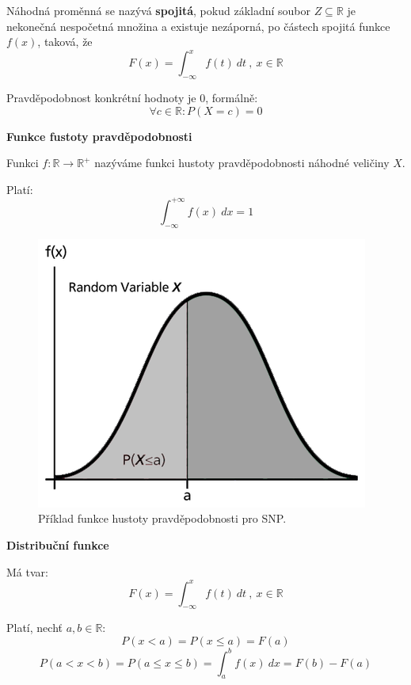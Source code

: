 \begin{compactitem}
    \item Náhodná proměnná se nazývá \textbf{spojitá}, pokud základní soubor $Z \subseteq \mathbb{R}$ je nekonečná nespočetná množina a existuje nezáporná, po částech spojitá funkce $f(x)$, taková, že
    $$ F(x) = \int_{- \infty}^{x} f(t) ~ dt ~,~ x \in \mathbb{R} $$

    \item Pravděpodobnost konkrétní hodnoty je $0$, formálně:
    $$ \forall c \in \mathbb{R} : P(X=c) = 0$$

    \item \textbf{Funkce fustoty pravděpodobnosti} \begin{compactitem}
        \item Funkci $f : \mathbb{R} \rightarrow \mathbb{R}^{+}$ nazýváme funkci hustoty pravděpodobnosti náhodné veličiny $X$.

        \item Platí:
        $$  $$
        $$ \int_{- \infty}^{+ \infty} f(x) ~ dx = 1$$
    \end{compactitem}

    \begin{figure}[H]
        \centering
        \includegraphics[width=0.5\linewidth]{snp_probability_density_function.png}
        \caption{Příklad funkce hustoty pravděpodobnosti pro SNP.}
    \end{figure}

    \item \textbf{Distribuční funkce} \begin{compactitem}
        \item Má tvar:
        $$ F(x) = \int_{- \infty}^{x} f(t) ~ dt ~,~ x \in \mathbb{R} $$

        \item Platí, nechť $a, b \in \mathbb{R}$:
        $$ P(x < a) = P(x \leq a) = F(a) $$
        $$ P(a < x < b) = P(a \leq x \leq b) = \int_a^b f(x) ~ dx = F(b) - F(a) $$
    \end{compactitem}


\end{compactitem}
